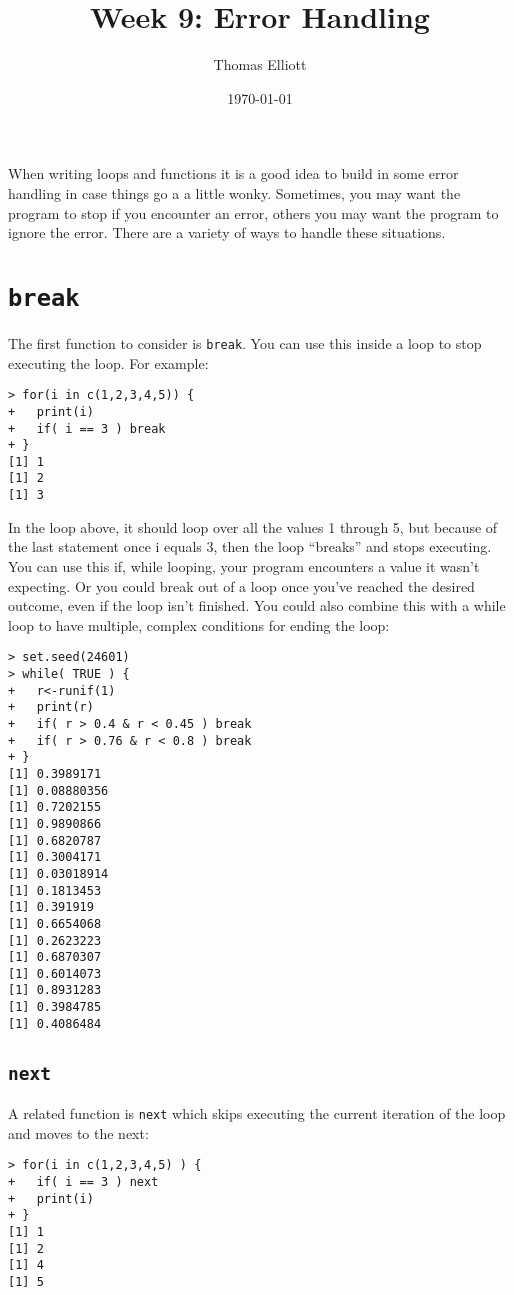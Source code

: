 \documentclass[12pt, oneside]{amsart}   	%
\title{Week 9: Error Handling}
\author{Thomas Elliott}
\date{\today}							%
\begin{document}
\maketitle

When writing loops and functions it is a good idea to build in some error handling in case things go a
a little wonky. Sometimes, you may want the program to stop if you encounter an error, others you may want the program to ignore the error. There are a variety of ways to handle these situations.

\section{\texttt{break}}

The first function to consider is \texttt{break}. You can use this inside a loop to stop executing the loop. For example:

\begin{verbatim}
> for(i in c(1,2,3,4,5)) {
+   print(i)
+   if( i == 3 ) break
+ }
[1] 1
[1] 2
[1] 3
\end{verbatim}

In the loop above, it should loop over all the values 1 through 5, but because of the last statement once i equals 3, then the loop ``breaks'' and stops executing. You can use this if, while looping, your program encounters a value it wasn't expecting. Or you could break out of a loop once you've reached the desired outcome, even if the loop isn't finished. You could also combine this with a while loop to have multiple, complex conditions for ending the loop:

\begin{verbatim}
> set.seed(24601)
> while( TRUE ) {
+   r<-runif(1)
+   print(r)
+   if( r > 0.4 & r < 0.45 ) break
+   if( r > 0.76 & r < 0.8 ) break
+ }
[1] 0.3989171
[1] 0.08880356
[1] 0.7202155
[1] 0.9890866
[1] 0.6820787
[1] 0.3004171
[1] 0.03018914
[1] 0.1813453
[1] 0.391919
[1] 0.6654068
[1] 0.2623223
[1] 0.6870307
[1] 0.6014073
[1] 0.8931283
[1] 0.3984785
[1] 0.4086484
\end{verbatim}

\subsection{\texttt{next}}

A related function is \texttt{next} which skips executing the current iteration of the loop and moves to the next:

\begin{verbatim}
> for(i in c(1,2,3,4,5) ) {
+   if( i == 3 ) next
+   print(i)
+ }
[1] 1
[1] 2
[1] 4
[1] 5
\end{verbatim}
\end{document}
